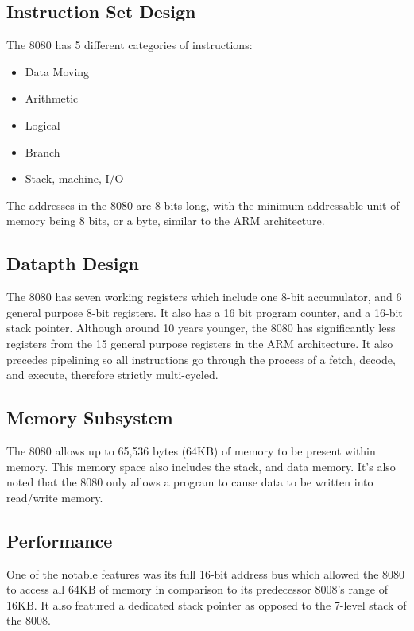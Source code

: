 \documentclass[draftclsnofoot, onecolumn, 10pt, compsoc]{IEEEtran}
\begin{document}
        \subsection{Instruction Set Design}
            The 8080 has 5 different categories of instructions: 
            \begin{itemize}
                \item Data Moving
                \item Arithmetic
                \item Logical
                \item Branch
                \item Stack, machine, I/O
            \end{itemize}
            The addresses in the 8080 are 8-bits long, with the minimum addressable unit of memory being 8 bits, or a byte, similar to the ARM architecture. 
            ~\cite{8080:Instruction}

            
        \subsection{Datapth Design}
            The 8080 has seven working registers which include one 8-bit accumulator, and 6 general purpose 8-bit registers. It also has a 16 bit program counter, and a 16-bit stack pointer. Although around 10 years younger, the 8080 has significantly less registers from the 15 general purpose registers in the ARM architecture. It also precedes pipelining so all instructions go through the process of a fetch, decode, and execute, therefore strictly multi-cycled. 
                ~\cite{8080:Registers}
                ~\cite{8080:Datapath}
        \subsection{Memory Subsystem}
            The 8080 allows up to 65,536 bytes (64KB) of memory to be present within memory. This memory space also includes the stack, and data memory. It’s also noted that the 8080 only allows a program to cause data to be written into read/write memory. 
                ~\cite{8080:Instruction}
                ~\cite{8080:Datapath}
        \subsection{Performance}
            One of the notable features was its full 16-bit address bus which allowed the 8080 to access all 64KB of memory in comparison to its predecessor 8008’s range of 16KB. It also featured a dedicated stack pointer as opposed to the 7-level stack of the 8008. 
                ~\cite{8080:Instruction}
        

    \newpage           
    
    
    
\end{document}
